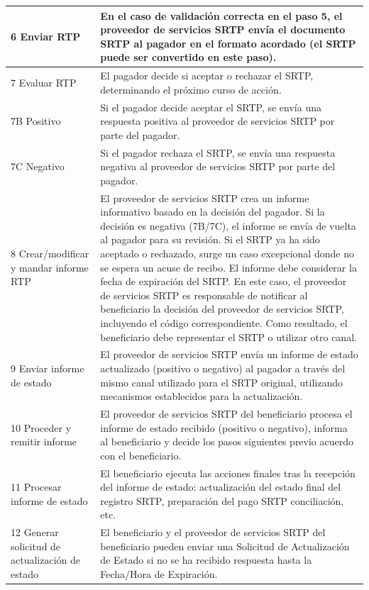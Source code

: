 \begin{longtable}{|p{3cm}|p{12cm}|}
  \hline
  6 Enviar RTP & En el caso de validación correcta en el paso 5, el proveedor de servicios SRTP envía el documento SRTP al pagador en el formato acordado (el SRTP puede ser convertido en este paso). \\
  \hline
  7 Evaluar RTP & El pagador decide si aceptar o rechazar el SRTP, determinando el próximo curso de acción. \\
  \hline
  7B Positivo & Si el pagador decide aceptar el SRTP, se envía una respuesta positiva al proveedor de servicios SRTP por parte del pagador. \\
  \hline
  7C Negativo & Si el pagador rechaza el SRTP, se envía una respuesta negativa al proveedor de servicios SRTP por parte del pagador. \\
  \hline
  8 Crear/modificar y mandar informe RTP & El proveedor de servicios SRTP crea un informe informativo basado en la decisión del pagador. Si la decisión es negativa (7B/7C), el informe se envía de vuelta al pagador para su revisión. Si el SRTP ya ha sido aceptado o rechazado, surge un caso excepcional donde no se espera un acuse de recibo. El informe debe considerar la fecha de expiración del SRTP. En este caso, el proveedor de servicios SRTP es responsable de notificar al beneficiario la decisión del proveedor de servicios SRTP, incluyendo el código correspondiente. Como resultado, el beneficiario debe representar el SRTP o utilizar otro canal. \\
  \hline
  9 Enviar informe de estado & El proveedor de servicios SRTP envía un informe de estado actualizado (positivo o negativo) al pagador a través del mismo canal utilizado para el SRTP original, utilizando mecanismos establecidos para la actualización. \\
  \hline
  10 Proceder y remitir informe & El proveedor de servicios SRTP del beneficiario procesa el informe de estado recibido (positivo o negativo), informa al beneficiario y decide los pasos siguientes previo acuerdo con el beneficiario. \\
  \hline
  11 Procesar informe de estado & El beneficiario ejecuta las acciones finales tras la recepción del informe de estado: actualización del estado final del registro SRTP, preparación del pago SRTP conciliación, etc. \\
  \hline
  12 Generar solicitud de actualización de estado & El beneficiario y el proveedor de servicios SRTP del beneficiario pueden enviar una Solicitud de Actualización de Estado si no se ha recibido respuesta hasta la Fecha/Hora de Expiración. \\

\end{longtable}
